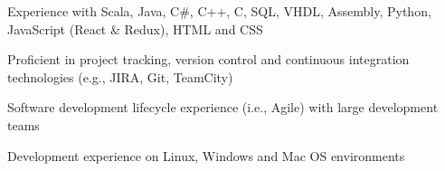 \begin{cvitems}
\sectionspace
\sectionspace
\vspace{1mm}
	\fontsize{11pt}{1.4em}\bodyfontlight\upshape\color{text}
        \item {Experience with Scala, Java, C\#, C++, C, SQL, VHDL, Assembly, Python, JavaScript (React \& Redux), HTML and CSS}
        \item {Proficient in project tracking, version control and continuous integration technologies (e.g., JIRA, Git, TeamCity)}
        \item {Software development lifecycle experience (i.e., Agile) with large development teams}
        \item {Development experience on Linux, Windows and Mac OS environments}
        \end{cvitems}
\vspace{1mm}
\sectionspace